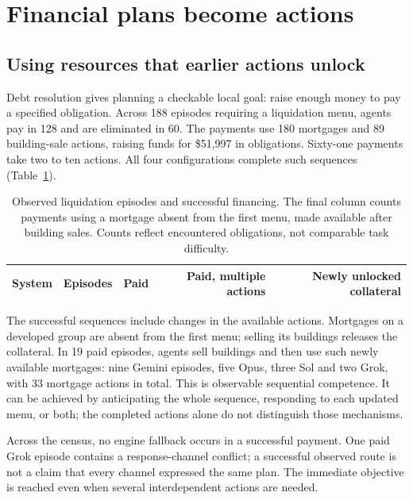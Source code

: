 \section{Financial plans become actions}
\label{sec:execution}

\subsection{Using resources that earlier actions unlock}
Debt resolution gives planning a checkable local goal: raise enough money to pay a specified obligation. Across 188 episodes requiring a liquidation menu, agents pay in 128 and are eliminated in 60. The payments use 180 mortgages and 89 building-sale actions, raising funds for \$51,997 in obligations. Sixty-one payments take two to ten actions. All four configurations complete such sequences (Table~\ref{tab:liquidation}).

\begin{table}[t]\centering\small
\begin{tabular}{@{}lrrrr@{}}\toprule
System & Episodes & Paid & Paid, multiple actions & Newly unlocked collateral\\\midrule

\end{tabular}
\caption{Observed liquidation episodes and successful financing. The final column counts payments using a mortgage absent from the first menu, made available after building sales. Counts reflect encountered obligations, not comparable task difficulty.}
\label{tab:liquidation}\end{table}

The successful sequences include changes in the available actions. Mortgages on a developed group are absent from the first menu; selling its buildings releases the collateral. In 19 paid episodes, agents sell buildings and then use such newly available mortgages: nine Gemini episodes, five Opus, three Sol and two Grok, with 33 mortgage actions in total. This is observable sequential competence. It can be achieved by anticipating the whole sequence, responding to each updated menu, or both; the completed actions alone do not distinguish those mechanisms.

Across the census, no engine fallback occurs in a successful payment. One paid Grok episode contains a response-channel conflict; a successful observed route is not a claim that every channel expressed the same plan. The immediate objective is reached even when several interdependent actions are needed.

